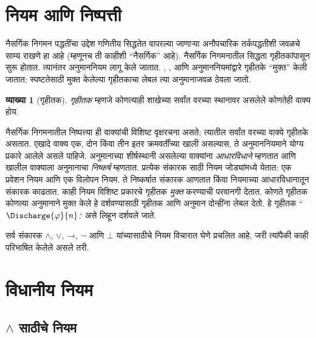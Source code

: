 \documentclass[11pt,a4paper,openany]{book}
\theoremstyle{definition}
\newtheorem{defn}{व्याख्या}[section]
\newenvironment{explain}{}{}
\newcommand{\lif}{\mathbin{\to}}
\newcommand{\lfalse}{\bot}
\begin{document}
\section{नियम आणि निष्पत्ती}\label{fol:ntd:rul:sec}

\begin{explain}
नैसर्गिक निगमन पद्धतींचा उद्देश गणितीय सिद्धतेत वापरल्या जाणाऱ्या अनौपचारिक
तर्कपद्धतीशी जवळचे साम्य राखणे हा आहे (म्हणूनच ती काहीशी ``नैसर्गिक'' आहे).
नैसर्गिक निगमनातील सिद्धता गृहीतकांपासून सुरू होतात.
त्यानंतर अनुमाननियम लागू केले जातात. \Intro{\lnot}, \Intro{\lif},
\Elim{\lor} आणि \Elim{\lexists} अनुमाननियमांद्वारे
गृहीतके ``मुक्त'' केली जातात; स्पष्टतेसाठी मुक्त केलेल्या
गृहीतकाचा लेबल त्या अनुमानाजवळ ठेवला जातो.
\end{explain}

\begin{defn}[गृहीतक]
\emph{गृहीतक} म्हणजे कोणत्याही शाखेच्या सर्वांत वरच्या स्थानावर असलेले
कोणतेही वाक्य होय.
\end{defn}

नैसर्गिक निगमनातील निष्पत्त्या ही वाक्यांची विशिष्ट वृक्षरचना असते;
त्यातील सर्वांत वरच्या वाक्ये गृहीतके असतात. एखादे वाक्य एक,
दोन किंवा तीन इतर क्रमवर्तींच्या खाली असल्यास, ते अनुमाननियमाने योग्य
प्रकारे आलेले असले पाहिजे. अनुमानाच्या शीर्षस्थानी असलेल्या वाक्यांना
\emph{आधारविधाने} म्हणतात आणि खालील वाक्याला अनुमानाचा
\emph{निष्कर्ष} म्हणतात. प्रत्येक संकारक साठी नियम जोड्यांमध्ये येतात:
एक प्रवेशन नियम आणि एक विलोपन नियम. ते निष्कर्षात संकारक आणतात
किंवा नियमाच्या आधारविधानातून संकारक काढतात. काही नियम विशिष्ट
प्रकारचे गृहीतक \emph{मुक्त} करण्याची परवानगी देतात. कोणते
गृहीतक कोणत्या अनुमानाने मुक्त केले हे दर्शवण्यासाठी गृहीतक आणि
अनुमान दोन्हींना लेबल देतो. हे गृहीतक ``$\Discharge{\varphi}{n}$.` असे लिहून दर्शवले जाते.


सर्व संकारक $\land$, $\lor$, $\lif$, $\lnot$ आणि $\lfalse$ यांच्यासाठीचे नियम विचारात घेणे प्रचलित आहे, जरी त्यांपैकी काही परिभाषित केलेले असले तरी.











\section{विधानीय नियम}\label{fol:ntd:prl:sec}


\subsection{$\land$ साठीचे नियम}
\end{document}
